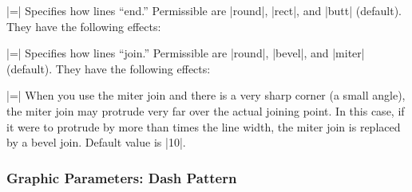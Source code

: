 \begin{itemize}
  |=|
  Specifies how lines ``end.'' Permissible  are |round|,
  |rect|, and |butt| (default). They have the following effects:

\begin{codeexample}[]
\end{codeexample}

  |=|
  Specifies how lines ``join.'' Permissible  are |round|,
  |bevel|, and |miter| (default). They have the following effects:

\begin{codeexample}[]
\end{codeexample}

  |=|
  When you use the miter join and there is a very sharp corner (a
  small angle), the miter join may protrude very far over the actual
  joining point. In this case, if it were to protrude by 
  more than  times the line width, the miter join is
  replaced by a bevel join. Default value is |10|.

\begin{codeexample}[]
\end{codeexample}
\end{itemize}

\subsubsection{Graphic Parameters: Dash Pattern}

